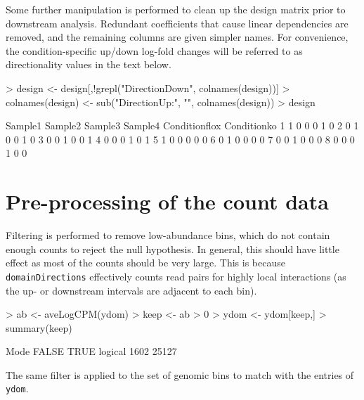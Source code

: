 \documentclass[12pt]{report}
\renewenvironment{Schunk}{\vspace{0pt}}{\vspace{0pt}}
\newcommand{\code}[1]{{\small\texttt{#1}}}
\begin{document}
Some further manipulation is performed to clean up the design matrix prior to downstream analysis.
Redundant coefficients that cause linear dependencies are removed, and the remaining columns are given simpler names.
For convenience, the condition-specific up/down log-fold changes will be referred to as directionality values in the text below.

\begin{Schunk}
\begin{Sinput}
> design <- design[,!grepl("DirectionDown", colnames(design))]
> colnames(design) <- sub("DirectionUp:", "", colnames(design)) 
> design
\end{Sinput}
\begin{Soutput}
  Sample1 Sample2 Sample3 Sample4 Conditionflox Conditionko
1       1       0       0       0             1           0
2       0       1       0       0             1           0
3       0       0       1       0             0           1
4       0       0       0       1             0           1
5       1       0       0       0             0           0
6       0       1       0       0             0           0
7       0       0       1       0             0           0
8       0       0       0       1             0           0
\end{Soutput}
\end{Schunk}

\section{Pre-processing of the count data}
Filtering is performed to remove low-abundance bins, which do not contain enough counts to reject the null hypothesis.
In general, this should have little effect as most of the counts should be very large.
This is because \code{domainDirections} effectively counts read pairs for highly local interactions (as the up- or downstream intervals are adjacent to each bin).

\begin{Schunk}
\begin{Sinput}
> ab <- aveLogCPM(ydom)
> keep <- ab > 0
> ydom <- ydom[keep,]
> summary(keep)
\end{Sinput}
\begin{Soutput}
   Mode   FALSE    TRUE 
logical    1602   25127 
\end{Soutput}
\end{Schunk}

The same filter is applied to the set of genomic bins to match with the entries of \code{ydom}. 
\end{document}
